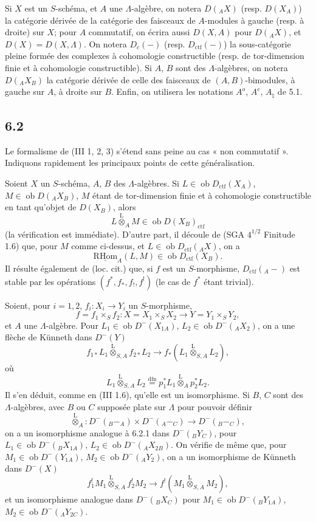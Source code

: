 \documentclass[11pt]{article}
\providecommand{\RHom}{\mathrm{RHom}}
\providecommand{\uRHom}{\underline{\RHom}}
\providecommand{\lten}{\overset{\mathrm L}{\otimes}}
\providecommand{\Ob}{\operatorname{ob}}
\providecommand{\RHom}{\mathrm{RHom}}
\providecommand{\lten}{\overset{\mathrm L}{\otimes}}
\providecommand{\RHom}{\mathrm R\mathcal{H}om}
\providecommand{\lten}{\overset{\mathrm L}{\otimes}}
\providecommand{\Ob}{\operatorname{ob}}
\providecommand{\lten}{\overset{\mathrm L}{\otimes}}
\providecommand{\lten}{\overset{\mathrm L}{\otimes}}
\providecommand{\Ob}{\operatorname{Ob}}
\providecommand{\lten}{\overset{\mathrm L}{\otimes}}
\providecommand{\RHom}{\mathrm{RHom}}
\providecommand{\Ob}{\operatorname{ob}}
\providecommand{\Ob}{\operatorname{Ob}}
\providecommand{\lten}{\overset{\mathrm L}{\otimes}}
\begin{document}
Si $X$ est un $S$-schéma, et $A$ une $\Lambda$-algèbre, on notera $D({}_AX)$ (resp. $D(X_A)$) la catégorie dérivée de la catégorie des faisceaux de $A$-modules à gauche (resp. à droite) sur $X$; pour $A$ commutatif, on écrira aussi $D(X,A)$ pour $D({}_AX)$, et $D(X)=D(X,\Lambda)$. On notera $D_c(-)$ (resp. $D_{\mathrm{ctf}}(-)$) la sous-catégorie pleine formée des complexes à cohomologie constructible (resp. de tor-dimension finie et à cohomologie constructible). Si $A$, $B$ sont des $\Lambda$-algèbres, on notera $D({}_AX_B)$ la catégorie dérivée de celle des faisceaux de $(A,B)$-bimodules, à gauche sur $A$, à droite sur $B$. Enfin, on utilisera les notations $A^o$, $A^e$, $A_{\natural}$ de 5.1.

\subsection*{6.2}
Le formalisme de (III 1, 2, 3) s'étend sans peine au cas « non commutatif ». Indiquons rapidement les principaux points de cette généralisation.

Soient $X$ un $S$-schéma, $A$, $B$ des $\Lambda$-algèbres. Si $L\in\Ob D_{\mathrm{ctf}}(X_A)$, $M\in\Ob D({}_AX_B)$, $M$ étant de tor-dimension finie et à cohomologie constructible en tant qu'objet de $D(X_B)$, alors
\[
L\lten_A M\in\Ob D(X_B)_{\mathrm{ctf}}
\]
(la vérification est immédiate). D'autre part, il découle de (SGA $4^{1/2}$ Finitude 1.6) que, pour $M$ comme ci-dessus, et $L\in\Ob D_{\mathrm{ctf}}({}_AX)$, on a
\[
\uRHom_A(L,M)\in\Ob D_{\mathrm{ctf}}(X_B).
\]
Il résulte également de (loc. cit.) que, si $f$ est un $S$-morphisme, $D_{\mathrm{ctf}}({}_A-)$ est stable par les opérations $(f^*,f_*,f_!,f^!)$ (le cas de $f^*$ étant trivial).

Soient, pour $i=1,2$, $f_i:X_i\to Y_i$ un $S$-morphisme,
\[
f=f_1\times_S f_2:X=X_1\times_SX_2\longrightarrow Y=Y_1\times_SY_2,
\]
et $A$ une $\Lambda$-algèbre. Pour $L_1\in\Ob D^-(X_{1A})$, $L_2\in\Ob D^-({}_AX_2)$, on a une flèche de Künneth dans $D^-(Y)$
\begin{equation}
f_{1*}L_1\lten_{S,A}f_{2*}L_2
\longrightarrow
f_*(L_1\lten_{S,A}L_2),
\tag{6.2.1}
\end{equation}
où
\[
L_1\lten_{S,A}L_2
\stackrel{\mathrm{dfn}}{=}p_1^*L_1\lten_Ap_2^*L_2.
\]
Il s'en déduit, comme en (III 1.6), qu'elle est un isomorphisme. Si $B$, $C$ sont des $\Lambda$-algèbres, avec $B$ ou $C$ supposée plate sur $\Lambda$ pour pouvoir définir
\[
\lten_A:D^-({}_B{-}_A)\times D^-({}_A{-}_C)\longrightarrow D^-({}_B{-}_C),
\]
on a un isomorphisme analogue à 6.2.1 dans $D^-({}_BY_C)$, pour $L_1\in\Ob D^-({}_BX_{1A})$, $L_2\in\Ob D^-({}_AX_{2B})$. On vérifie de même que, pour $M_1\in\Ob D^-(Y_{1A})$, $M_2\in\Ob D^-({}_AY_2)$, on a un isomorphisme de Künneth dans $D^-(X)$
\begin{equation}
f_1^!M_1\lten_{S,A}f_2^!M_2
\longrightarrow
f^!(M_1\lten_{S,A}M_2),
\tag{6.2.2}
\end{equation}
et un isomorphisme analogue dans $D^-({}_B X_C)$ pour $M_1\in\Ob D^-({}_BY_{1A})$, $M_2\in\Ob D^-({}_AY_{2C})$.
\end{document}
